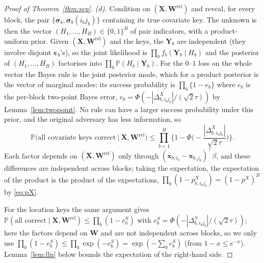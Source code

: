 \documentclass[11pt]{article}
\theoremstyle{definition}
\newcommand{\bX}{\mathbf{X}}
\newcommand{\bx}{\bm{x}}\newcommand{\bg}{\bm{g}}\newcommand{\bw}{\bm{w}}\newcommand{\bz}{\bm{z}}
\newcommand{\bY}{\mathbf{Y}}
\newcommand{\bW}{\mathbf{W}}
\newcommand{\beps}{\boldsymbol{\varepsilon}}
\newcommand{\bsigma}{\boldsymbol{\sigma}}
\newcommand{\Prob}{\mathbb{P}}
\newcommand{\rel}{\mathrm{rel}}
\begin{document}
\begin{proof}[Proof of Theorem~\ref{thm:sep}]
\emph{(d).} Condition on $(\bX,\bW^\rel)$ and reveal, for every block, the pair $\{\bsigma_b,\bsigma_b(i_bj_b)\}$ containing its true covariate key. The unknown is then the vector $(H_1,\dots,H_B)\in\{0,1\}^B$ of pair indicators, with a product-uniform prior. Given $(\bX,\bW^\rel)$ and the keys, the $\bY_b$ are independent (they involve disjoint $\beps_b$'s), so the joint likelihood is $\prod_bf_b(\bY_b\mid H_b)$ and the posterior of $(H_1,\dots,H_B)$ factorises into $\prod_b\Prob(H_b\mid\bY_b)$. For the $0$--$1$ loss on the whole vector the Bayes rule is the joint posterior mode, which for a product posterior is the vector of marginal modes; its success probability is $\prod_b\{1-e_b\}$ where $e_b$ is the per-block two-point Bayes error, $e_b=\Phi(-|\Delta^X_{b,i_bj_b}|/(\sqrt2\tau))$ by Lemma~\ref{lem:twopoint}. No rule can have a larger success probability under this prior, and the original adversary has less information, so
\[
\Prob\big(\text{all covariate keys correct}\ \big|\ \bX,\bW^\rel\big)\le\prod_{b=1}^B\Big\{1-\Phi\Big(-\frac{|\Delta^X_{b,i_bj_b}|}{\sqrt2\tau}\Big)\Big\}.
\]
Each factor depends on $(\bX,\bW^\rel)$ only through $(\bx_{b,i_b}-\bx_{b,j_b})^\top\beta$, and these differences are independent across blocks; taking the expectation, the expectation of the product is the product of the expectations, $\prod_b(1-p^X_{b,i_bj_b})=(1-p^X)^B$ by \eqref{eq:pX}.

For the location keys the same argument gives $\Prob(\text{all correct}\mid\bX,\bW^\rel)\le\prod_b(1-e^S_b)$ with $e^S_b=\Phi(-|\Delta^S_{b,i_bj_b}|/(\sqrt2\tau))$; here the factors depend on $\bW$ and are not independent across blocks, so we only use $\prod_b(1-e^S_b)\le\prod_b\exp(-e^S_b)=\exp(-\sum_be^S_b)$ (from $1-x\le e^{-x}$). Lemma~\ref{lem:lln} below bounds the expectation of the right-hand side.
\end{proof}
\end{document}
